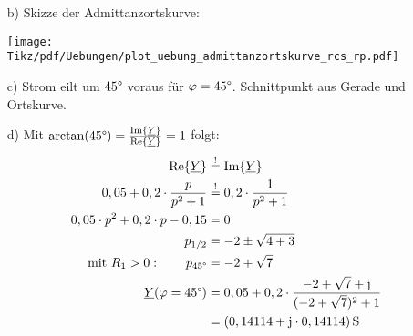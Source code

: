 {\begin{minipage}{0.4\textwidth}
\begin{itemize}
\item[b)] Skizze der Admittanzortskurve:
\item[] \texttt{[image: Tikz/pdf/Uebungen/plot\_uebung\_admittanzortskurve\_rcs\_rp.pdf]}
\item[c)] Strom eilt um $45\degree$ voraus für $\varphi=45\degree$.
    Schnittpunkt aus Gerade und Ortskurve.
\end{itemize}
\end{minipage}%
\begin{minipage}{0.6\textwidth}
\begin{itemize}
    \item[d)] Mit $\arctan(45\degree)=\frac{\operatorname{Im}\{\underline{Y}\}}{\operatorname{Re}\{\underline{Y}\}} = 1$ folgt:
    \begin{align*}
        \operatorname{Re}\{\underline{Y}\} &\overset{!}{=} \operatorname{Im}\{\underline{Y}\} \\
        0,05 + 0,2 \cdot \frac{p}{p^2+1} &\overset{!}{=} 0,2 \cdot \frac{1}{p^2+1}\\
        0,05 \cdot p^2 + 0,2 \cdot p - 0,15 &= 0 \\
        p_{1/2} &= -2 \pm \sqrt{4 + 3} \\
        \text{mit }R_1>0: \qquad p_{45\degree} &= -2 + \sqrt{7} \\
        \underline{Y}(\varphi=45\degree) &= 0,05 + 0,2 \cdot \frac{-2 + \sqrt{7} + \mathrm{j}}{(-2 + \sqrt{7})^2 + 1} \\
        &= (0,14114 + \mathrm{j} \cdot 0,14114)\,\mathrm{S}
    \end{align*}
\end{itemize}
\end{minipage}\hfill
}


